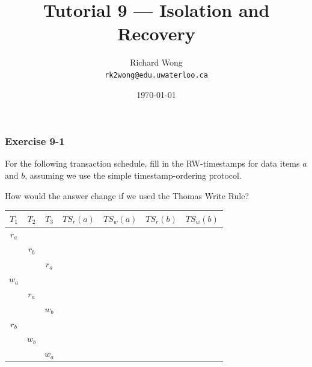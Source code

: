 

\def\ojoin{\setbox0=\hbox{$\bowtie$}%
  \rule[-.02ex]{.25em}{.4pt}\llap{\rule[\ht0]{.25em}{.4pt}}}
\def\leftouterjoin{\mathbin{\ojoin\mkern-5.8mu\bowtie}}

\title{Tutorial 9 --- Isolation and Recovery }

\author{Richard Wong \\ \small \texttt{rk2wong@edu.uwaterloo.ca}}
\date{\today}




\begin{frame}
  \titlepage

\end{frame}


\begin{frame}
\frametitle{Exercise 9-1}

For the following transaction schedule, fill in the RW-timestamps for data items $a$ and $b$, assuming we use the simple timestamp-ordering protocol.

How would the answer change if we used the Thomas Write Rule?

\begin{center}
\begin{tabular}{ | c c c || c c c c | }
  \hline
  $T_1$ & $T_2$ & $T_3$ & $TS_r(a)$ & $TS_w(a)$ & $TS_r(b)$ & $TS_w(b)$ \\
  \hline
  $r_a$ &       &       &           &           &           &           \\
        & $r_b$ &       &           &           &           &           \\
        &       & $r_a$ &           &           &           &           \\
  $w_a$ &       &       &           &           &           &           \\
        & $r_a$ &       &           &           &           &           \\
        &       & $w_b$ &           &           &           &           \\
  $r_b$ &       &       &           &           &           &           \\
        & $w_b$ &       &           &           &           &           \\
        &       & $w_a$ &           &           &           &           \\
  \hline
\end{tabular}
\end{center}

\end{frame}



